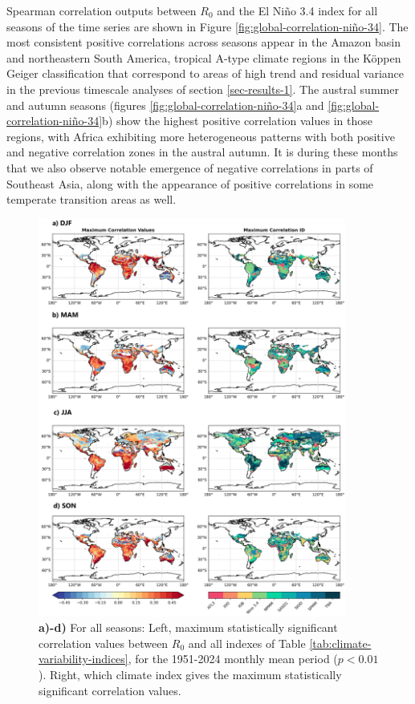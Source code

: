 \documentclass[10pt,twocolumn]{wlscirep}
\begin{document}
Spearman correlation outputs between $R_0$ and the El Niño 3.4 index for all seasons of the time series are shown in Figure \ref{fig:global-correlation-niño-34}. The most consistent positive correlations across seasons appear in the Amazon basin and northeastern South America, tropical A-type climate regions in the Köppen Geiger classification that correspond to areas of high trend and residual variance in the previous timescale analyses of section \ref{sec-results-1}. The austral summer and autumn seasons (figures \ref{fig:global-correlation-niño-34}a and \ref{fig:global-correlation-niño-34}b) show the highest positive correlation values in those regions, with Africa exhibiting more heterogeneous patterns with both positive and negative correlation zones in the austral autumn. It is during these months that we also observe notable emergence of negative correlations in parts of Southeast Asia, along with the appearance of positive correlations in some temperate transition areas as well.
\\
\begin{figure}[!ht]
  \centering
  \includegraphics[width=0.9\textwidth]{correlation_final_global_ps.png}
  \caption{\textbf{a)-d)} For all seasons: Left, maximum statistically significant correlation values between $R_0$ and all indexes of Table \ref{tab:climate-variability-indices}, for the 1951-2024 monthly mean period ($p < 0.01$). Right, which climate index gives the maximum statistically significant correlation values.}
  \label{fig:global-correlation-final}
\end{figure}
\end{document}

